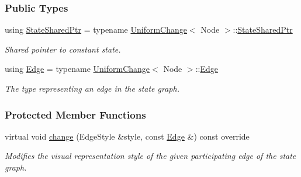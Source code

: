 \subsubsection*{Public Types}
\begin{DoxyCompactItemize}
\item 
using \hyperlink{structslb_1_1ext_1_1event_1_1SolvedGoal_a781dccb882cebd3d0ef4b8d1c5ca7f71}{State\+Shared\+Ptr} = typename \hyperlink{structslb_1_1ext_1_1event_1_1UniformChange}{Uniform\+Change}$<$ Node $>$\+::\hyperlink{structslb_1_1ext_1_1event_1_1UniformChange_a2e6e9605dcd4df428c03c7637fd0d20d}{State\+Shared\+Ptr}\hypertarget{structslb_1_1ext_1_1event_1_1SolvedGoal_a781dccb882cebd3d0ef4b8d1c5ca7f71}{}\label{structslb_1_1ext_1_1event_1_1SolvedGoal_a781dccb882cebd3d0ef4b8d1c5ca7f71}

\begin{DoxyCompactList}\small\item\em Shared pointer to constant state. \end{DoxyCompactList}\item 
using \hyperlink{structslb_1_1ext_1_1event_1_1SolvedGoal_a37b951e6b4e7e06c8ee51f9904e29ac7}{Edge} = typename \hyperlink{structslb_1_1ext_1_1event_1_1UniformChange}{Uniform\+Change}$<$ Node $>$\+::\hyperlink{structslb_1_1ext_1_1event_1_1UniformChange_a7ea26ff1c10c84d9bd6002bf5f175f22}{Edge}\hypertarget{structslb_1_1ext_1_1event_1_1SolvedGoal_a37b951e6b4e7e06c8ee51f9904e29ac7}{}\label{structslb_1_1ext_1_1event_1_1SolvedGoal_a37b951e6b4e7e06c8ee51f9904e29ac7}

\begin{DoxyCompactList}\small\item\em The type representing an edge in the state graph. \end{DoxyCompactList}\end{DoxyCompactItemize}
\subsubsection*{Protected Member Functions}
\begin{DoxyCompactItemize}
\item 
virtual void \hyperlink{structslb_1_1ext_1_1event_1_1SolvedGoal_a0d0707b92a0fcd9ae6348e2feff4aad2}{change} (Edge\+Style \&style, const \hyperlink{structslb_1_1ext_1_1event_1_1UniformChange_a7ea26ff1c10c84d9bd6002bf5f175f22}{Edge} \&) const override\hypertarget{structslb_1_1ext_1_1event_1_1SolvedGoal_a0d0707b92a0fcd9ae6348e2feff4aad2}{}\label{structslb_1_1ext_1_1event_1_1SolvedGoal_a0d0707b92a0fcd9ae6348e2feff4aad2}

\begin{DoxyCompactList}\small\item\em Modifies the visual representation style of the given participating edge of the state graph. \end{DoxyCompactList}\end{DoxyCompactItemize}
